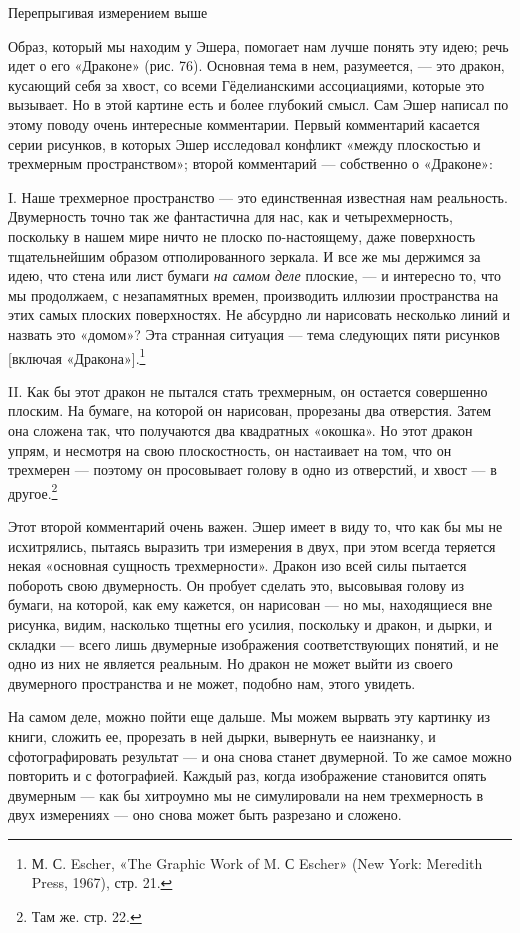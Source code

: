 Перепрыгивая измерением выше

Образ, который мы находим у Эшера, помогает нам лучше понять эту идею; речь идет о его «Драконе» (рис. 76). Основная тема в нем, разумеется, --- это дракон, кусающий себя за хвост, со всеми Гёделианскими ассоциациями, которые это вызывает. Но в этой картине есть и более глубокий смысл. Сам Эшер написал по этому поводу очень интересные комментарии. Первый комментарий касается серии рисунков, в которых Эшер исследовал конфликт «между плоскостью и трехмерным пространством»; второй комментарий --- собственно о «Драконе»:

I. Наше трехмерное пространство --- это единственная известная нам реальность. Двумерность точно так же фантастична для нас, как и четырехмерность, поскольку в нашем мире ничто не плоско по-настоящему, даже поверхность тщательнейшим образом отполированного зеркала. И все же мы держимся за идею, что стена или лист бумаги \emph{на самом деле} плоские, --- и интересно то, что мы продолжаем, с незапамятных времен, производить иллюзии пространства на этих самых плоских поверхностях. Не абсурдно ли нарисовать несколько линий и назвать это «домом»? Эта странная ситуация --- тема следующих пяти рисунков {[}включая «Дракона»{]}.\footnote{М. С. Escher, «The Graphic Work of M. С Escher» (New York: Meredith Press, 1967), стр. 21.}

II. Как бы этот дракон не пытался стать трехмерным, он остается совершенно плоским. На бумаге, на которой он нарисован, прорезаны два отверстия. Затем она сложена так, что получаются два квадратных «окошка». Но этот дракон упрям, и несмотря на свою плоскостность, он настаивает на том, что он трехмерен --- поэтому он просовывает голову в одно из отверстий, и хвост --- в другое.\footnote{Там же. стр. 22.}

Этот второй комментарий очень важен. Эшер имеет в виду то, что как бы мы не исхитрялись, пытаясь выразить три измерения в двух, при этом всегда теряется некая «основная сущность трехмерности». Дракон изо всей силы пытается побороть свою двумерность. Он пробует сделать это, высовывая голову из бумаги, на которой, как ему кажется, он нарисован --- но мы, находящиеся вне рисунка, видим, насколько тщетны его усилия, поскольку и дракон, и дырки, и складки --- всего лишь двумерные изображения соответствующих понятий, и не одно из них не является реальным. Но дракон не может выйти из своего двумерного пространства и не может, подобно нам, этого увидеть.

На самом деле, можно пойти еще дальше. Мы можем вырвать эту картинку из книги, сложить ее, прорезать в ней дырки, вывернуть ее наизнанку, и сфотографировать результат --- и она снова станет двумерной. То же самое можно повторить и с фотографией. Каждый раз, когда изображение становится опять двумерным --- как бы хитроумно мы не симулировали на нем трехмерность в двух измерениях --- оно снова может быть разрезано и сложено.

